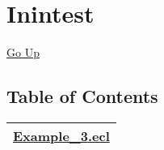 \chapter*{\color{headtoc} Inintest}
\hypertarget{ecldoc:toc:root/Inintest}{}
\hyperlink{ecldoc:toc:root}{Go Up}


\section*{Table of Contents}
{\renewcommand{\arraystretch}{1.5}
\begin{longtable}{|p{\textwidth}|}
\hline
\hyperlink{ecldoc:toc:Inintest.Example_3}{Example\_3.ecl} \\
\hline
\end{longtable}
}


